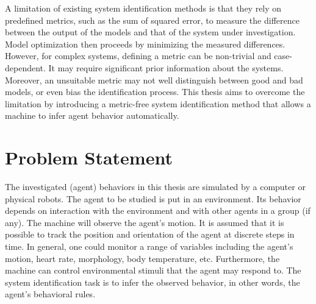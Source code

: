 A limitation of existing system identification methods is that they rely on predefined metrics, such as the sum of squared error, to measure the difference between the output of the models and that of the system under investigation. Model optimization then proceeds by minimizing the measured differences. However, for complex systems, defining a metric can be non-trivial and case-dependent. It may require significant prior information about the systems. Moreover, an unsuitable metric may not well distinguish between good and bad models, or even bias the identification process. This thesis aims to overcome the limitation by introducing a metric-free system identification method that allows a machine to infer agent behavior automatically.


\section{Problem Statement}

The investigated (agent) behaviors in this thesis are simulated by a computer or physical robots. The agent to be studied is put in an environment. Its behavior depends on interaction with the environment and with other agents in a group (if any). The machine will observe the agent's motion. It is assumed that it is possible to track the position and orientation of the agent at discrete steps in time. In general, one could monitor a range of variables including the agent's motion, heart rate, morphology, body temperature, etc. Furthermore, the machine can control environmental stimuli that the agent may respond to. The system identification task is to infer the observed behavior, in other words, the agent's behavioral rules. 


